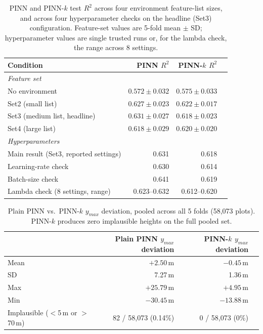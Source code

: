 \documentclass[logo,msc,ai]{infthesis}           %
\begin{document}
\begin{table}[!htbp]
\centering
\scriptsize
\begin{tabular*}{\textwidth}{@{\extracolsep{\fill}}lrrr@{}}
\toprule
Condition & PINN $R^2$ & PINN-$k$ $R^2$ \\
\midrule
\multicolumn{3}{l}{\textit{Feature set}} \\
No environment & $0.572\pm0.032$ & $0.575\pm0.033$ \\
Set2 (small list) & $0.627\pm0.023$ & $0.622\pm0.017$ \\
Set3 (medium list, headline) & $0.631\pm0.027$ & $0.618\pm0.023$ \\
Set4 (large list) & $0.618\pm0.029$ & $0.620\pm0.020$ \\
\midrule
\multicolumn{3}{l}{\textit{Hyperparameters}} \\
Main result (Set3, reported settings) & 0.631 & 0.618 \\
Learning-rate check & 0.630 & 0.614 \\
Batch-size check & 0.641 & 0.619 \\
Lambda check (8 settings, range) & 0.623--0.632 & 0.612--0.620 \\
\bottomrule
\end{tabular*}
\caption{\small{PINN and PINN-$k$ test $R^2$ across four environment feature-list sizes, and
across four hyperparameter checks on the headline (Set3) configuration. Feature-set values are
5-fold mean $\pm$ SD; hyperparameter values are single trusted runs or, for the lambda check,
the range across 8 settings.}} %
\label{tab:pinn-conditions}
\end{table}

\begin{table}[!htbp]
\centering
\scriptsize
\begin{tabular*}{\textwidth}{@{\extracolsep{\fill}}lrrr@{}}
\toprule
& Plain PINN $y_{max}$ deviation & PINN-$k$ $y_{max}$ deviation \\
\midrule
Mean & $+2.50$\,m & $-0.45$\,m \\
SD & 7.27\,m & 1.36\,m \\
Max & $+25.79$\,m & $+4.95$\,m \\
Min & $-30.45$\,m & $-13.88$\,m \\
Implausible ($<$5\,m or $>$70\,m) & 82 / 58,073 (0.14\%) & 0 / 58,073 (0\%) \\
\bottomrule
\end{tabular*}
\caption{\small{Plain PINN vs.\ PINN-$k$ $y_{max}$ deviation, pooled across all 5 folds
(58,073 plots). PINN-$k$ produces zero implausible heights on the full pooled set.}}
\label{tab:plausibility-comparison}
\end{table}
\end{document}
